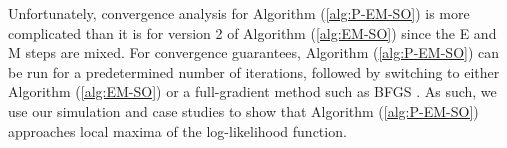 

Unfortunately, convergence analysis for Algorithm (\ref{alg:P-EM-SO}) is more complicated than it is for version 2 of Algorithm (\ref{alg:EM-SO}) since the E and M steps are mixed. For convergence guarantees, Algorithm (\ref{alg:P-EM-SO}) can be run for a predetermined number of iterations, followed by switching to either Algorithm (\ref{alg:EM-SO}) or a full-gradient method such as BFGS \citep{Fletcher:2000}. As such, we use our simulation and case studies to show that Algorithm (\ref{alg:P-EM-SO}) approaches local maxima of the log-likelihood function.





